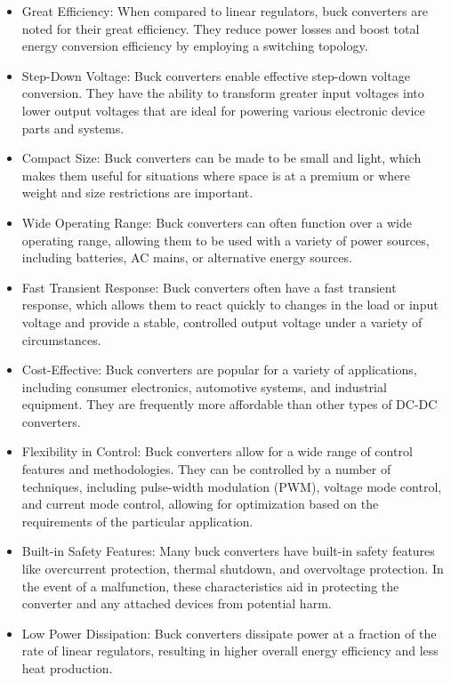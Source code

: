 \documentclass[
12pt,
oneside, 
onehalfspacing, 
nolistspacing, 
parskip, 
chapterinoneline, 
]{AASTCOMPUTER}
\begin{document}
\begin{itemize}
    \item Great Efficiency: When compared to linear regulators, buck converters are noted for their great efficiency. They reduce power losses and boost total energy conversion efficiency by employing a switching topology.
    \item Step-Down Voltage: Buck converters enable effective step-down voltage conversion. They have the ability to transform greater input voltages into lower output voltages that are ideal for powering various electronic device parts and systems.
    \item Compact Size: Buck converters can be made to be small and light, which makes them useful for situations where space is at a premium or where weight and size restrictions are important.
    \item Wide Operating Range: Buck converters can often function over a wide operating range, allowing them to be used with a variety of power sources, including batteries, AC mains, or alternative energy sources.
    \item Fast Transient Response: Buck converters often have a fast transient response, which allows them to react quickly to changes in the load or input voltage and provide a stable, controlled output voltage under a variety of circumstances.
    \item Cost-Effective: Buck converters are popular for a variety of applications, including consumer electronics, automotive systems, and industrial equipment. They are frequently more affordable than other types of DC-DC converters.
    \item Flexibility in Control: Buck converters allow for a wide range of control features and methodologies. They can be controlled by a number of techniques, including pulse-width modulation (PWM), voltage mode control, and current mode control, allowing for optimization based on the requirements of the particular application.
    \item Built-in Safety Features: Many buck converters have built-in safety features like overcurrent protection, thermal shutdown, and overvoltage protection. In the event of a malfunction, these characteristics aid in protecting the converter and any attached devices from potential harm.
    \item Low Power Dissipation: Buck converters dissipate power at a fraction of the rate of linear regulators, resulting in higher overall energy efficiency and less heat production.
\end{itemize}
\end{document}
